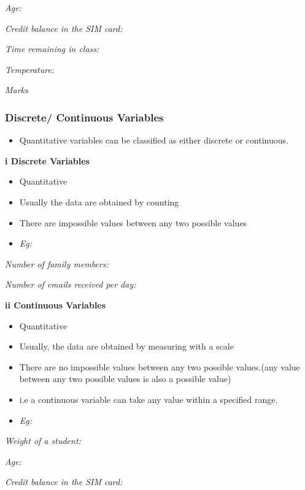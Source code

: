 \documentclass[]{book}
\providecommand{\tightlist}{%
  \setlength{\itemsep}{0pt}\setlength{\parskip}{0pt}}
\begin{document}
\emph{Age:}

\emph{Credit balance in the SIM card:}

\emph{Time remaining in class:}

\emph{Temperature:}

\emph{Marks }

\hypertarget{discrete-continuous-variables}{%
\subsubsection{Discrete/ Continuous Variables}\label{discrete-continuous-variables}}

\begin{itemize}
\tightlist
\item
  Quantitative variables can be classified as either discrete or continuous.
\end{itemize}

\textbf{i Discrete Variables}

\begin{itemize}
\tightlist
\item
  Quantitative
\item
  Usually the data are obtained by counting
\item
  There are impossible values between any two possible values
\item
  \emph{Eg:}
\end{itemize}

\emph{Number of family members:}

\emph{Number of emails received per day:}

\textbf{ii Continuous Variables}

\begin{itemize}
\tightlist
\item
  Quantitative
\item
  Usually, the data are obtained by measuring with a scale
\item
  There are no impossible values between any two possible values.(any value between any two possible values is also a possible value)
\item
  i.e a continuous variable can take any value within a specified range.
\item
  \emph{Eg:}
\end{itemize}

\emph{Weight of a student:}

\emph{Age:}

\emph{Credit balance in the SIM card:}
\end{document}
